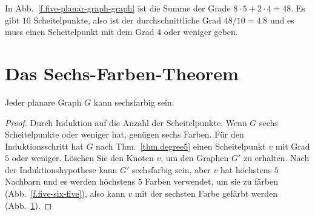 \begin{example}
In Abb.~\ref{f.five-planar-graph-graph} ist die Summe der Grade $8\cdot 5 + 2\cdot 4=48$. Es gibt $10$ Scheitelpunkte, also ist der durchschnittliche Grad $48/10=4.8$ und es muss einen Scheitelpunkt mit dem Grad $4$ oder weniger geben.
\end{example}

\section{Das Sechs-Farben-Theorem}\label{s.six-color}

\begin{theorem}\label{thm.sixcolor}
Jeder planare Graph $G$ kann sechsfarbig sein.
\end{theorem}
\begin{proof}
Durch Induktion auf die Anzahl der Scheitelpunkte. Wenn $G$ sechs Scheitelpunkte oder weniger hat, genügen sechs Farben.
Für den Induktionsschritt hat $G$ nach Thm.~\ref{thm.degree5} einen Scheitelpunkt $v$ mit Grad $5$ oder weniger. Löschen Sie den Knoten $v$, um den Graphen $G'$ zu erhalten. Nach der Induktionshypothese kann $G'$ sechsfarbig sein, aber $v$ hat höchstens $5$ Nachbarn und es werden höchstens $5$ Farben verwendet, um sie zu färben (Abb.~\ref{f.five-six-five}), also kann $v$ mit der sechsten Farbe gefärbt werden (Abb.~\ref{f.five-six-six}).
\end{proof}

\begin{figure}[hbt]
\subfigures
{}
\hfill
{}
\label{f.five-six-five}
\label{f.five-six-six}
\end{figure}

